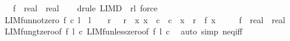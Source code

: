 \begin{isabellebody}
\ \ \ f\ {\isacharcolon}{\kern0pt}{\isacharcolon}{\kern0pt}\ {\isachardoublequoteopen}real\ {\isasymRightarrow}\ real{\isachardoublequoteclose}\isanewline
%
\isadelimproof
\ \ %
\endisadelimproof
%
\isatagproof
{}\isamarkupfalse%
\ {\isacharparenleft}{\kern0pt}drule\ LIM{\isacharunderscore}{\kern0pt}D\ {\isacharbrackleft}{\kern0pt}\ r{\isacharequal}{\kern0pt}{\isachardoublequoteopen}{\isacharminus}{\kern0pt}l{\isachardoublequoteclose}{\isacharbrackright}{\kern0pt}{\isacharparenright}{\kern0pt}\ force{\isacharplus}{\kern0pt}%
\endisatagproof
{\isafoldproof}%
%
\isadelimproof
\isanewline
%
\endisadelimproof
\isanewline
{}\isamarkupfalse%
\ LIM{\isacharunderscore}{\kern0pt}fun{\isacharunderscore}{\kern0pt}not{\isacharunderscore}{\kern0pt}zero{\isacharcolon}{\kern0pt}\ {\isachardoublequoteopen}f\ {\isasymmidarrow}c{\isasymrightarrow}\ l\ {\isasymLongrightarrow}\ l\ {\isasymnoteq}\ {}\ {\isasymLongrightarrow}\ {\isasymexists}r{\isachardot}{\kern0pt}\ {}\ {\isacharless}{\kern0pt}\ r\ {\isasymand}\ {\isacharparenleft}{\kern0pt}{\isasymforall}x{\isachardot}{\kern0pt}\ x\ {\isasymnoteq}\ c\ {\isasymand}\ {\isasymbar}c\ {\isacharminus}{\kern0pt}\ x{\isasymbar}\ {\isacharless}{\kern0pt}\ r\ {\isasymlongrightarrow}\ f\ x\ {\isasymnoteq}\ {}{\isacharparenright}{\kern0pt}{\isachardoublequoteclose}\isanewline
\ \ \ f\ {\isacharcolon}{\kern0pt}{\isacharcolon}{\kern0pt}\ {\isachardoublequoteopen}real\ {\isasymRightarrow}\ real{\isachardoublequoteclose}\isanewline
%
\isadelimproof
\ \ %
\endisadelimproof
%
\isatagproof
{}\isamarkupfalse%
\ LIM{\isacharunderscore}{\kern0pt}fun{\isacharunderscore}{\kern0pt}gt{\isacharunderscore}{\kern0pt}zero{\isacharbrackleft}{\kern0pt}of\ f\ l\ c{\isacharbrackright}{\kern0pt}\ LIM{\isacharunderscore}{\kern0pt}fun{\isacharunderscore}{\kern0pt}less{\isacharunderscore}{\kern0pt}zero{\isacharbrackleft}{\kern0pt}of\ f\ l\ c{\isacharbrackright}{\kern0pt}\ \isamarkupfalse%
\ {\isacharparenleft}{\kern0pt}auto\ simp{\isacharcolon}{\kern0pt}\ neq{\isacharunderscore}{\kern0pt}iff{\isacharparenright}{\kern0pt}%
\endisatagproof
{\isafoldproof}%
%
\isadelimproof
\isanewline
%
\endisadelimproof
%
\isadelimtheory
\isanewline
%
\endisadelimtheory
%
\isatagtheory
{}\isamarkupfalse%
%
\endisatagtheory
{\isafoldtheory}%
%
\isadelimtheory
%
\endisadelimtheory
%
\end{isabellebody}%
\endinput
